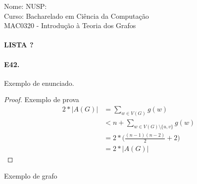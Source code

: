 \documentclass[11pt,a4paper,notitlepage]{exam}
\begin{document}
\begin{center}
Nome: \hphantom{xxx} NUSP: \\
Curso: Bacharelado em Ciência da Computação\\
MAC0320 - Introdução à Teoria dos Grafos
\paragraph{}
\textbf{LISTA ?}
\end{center}

\paragraph*{E42.} Exemplo de enunciado.
\begin{proof}
 
  Exemplo de prova
\begin{align*}
  2 * |A(G)| &= \sum_{w \in V(G)} g(w)\\ &< n + \sum_{w \in V(G) \setminus \{u, v\}} g(w)\\
                                      &= 2*\Big(\frac{(n - 1)(n - 2)}{2} + 2\Big)\\
                                      &= 2*|A(G)|
\end{align*}
\end{proof}

Exemplo de grafo
\begin{center}
\end{center}
\end{document}
